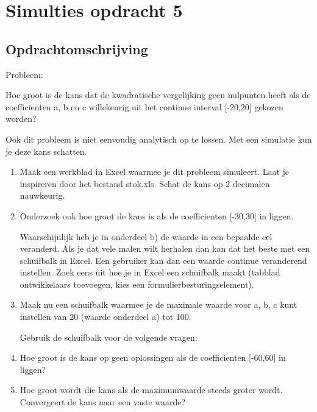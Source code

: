 \documentclass{article}
\begin{document}



\section{Simulties opdracht 5}
\label{sec:sample_main}

\subsection{Opdrachtomschrijving}
\label{subsec:sample_opdrom}

Probleem:

Hoe groot is de kans dat de kwadratische vergelijking geen nulpunten heeft als de coefficienten a, b en c willekeurig uit het continue interval [-20,20] gekozen worden?

Ook dit probleem is niet eenvoudig analytisch op te lossen. Met een simulatie kun je deze kans schatten.


\begin{enumerate}[label=(\Alph*)]

\item Maak een werkblad in Excel waarmee je dit probleem simuleert. Laat je inspireren door het bestand stok.xls. Schat de kans op 2 decimalen nauwkeurig.

\item Onderzoek ook hoe groot de kans is als de coefficienten [-30,30] in liggen.

Waarschijnlijk heb je in onderdeel b) de waarde in een bepaalde cel veranderd. Als je dat vele malen wilt herhalen dan kan dat het beste met een schuifbalk in Excel. Een gebruiker kan dan een waarde continue veranderend instellen. Zoek eens uit hoe je in Excel een schuifbalk maakt (tabblad ontwikkelaars toevoegen, kies een formulierbesturingselement).

\item Maak nu een schuifbalk waarmee je de maximale waarde voor a, b, c kunt instellen van 20 (waarde onderdeel a) tot 100.

Gebruik de schuifbalk voor de volgende vragen:

\item Hoe groot is de kans op geen oplossingen als de coefficienten [-60,60] in liggen?

\item Hoe groot wordt die kans als de maximumwaarde steeds groter wordt. Convergeert de kans naar een vaste waarde?
\end{enumerate}
\end{document}
